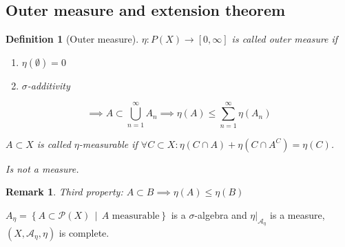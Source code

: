 \documentclass[a4paper]{article}
\newcounter{lecref}[section]
\numberwithin{lecref}{section}
\theoremstyle{break}
\newtheorem{definition}[lecref]{Definition}
\newtheorem*{Remark}{Remark}
\newcommand{\SetDef}[2]{\left\{#1\,\mid\,#2\right\}}
\begin{document}
\subsection{Outer measure and extension theorem}
\begin{definition}[Outer measure]
  $\eta: P(X) \to [0, \infty]$ is called \emph{outer measure} if
  \begin{enumerate}
    \item $\eta(\emptyset) = 0$
    \item $\sigma$-additivity
  \end{enumerate}
  \[ \implies A \subset \bigcup_{n=1}^\infty A_n \implies \eta(A) \leq \sum_{n=1}^\infty \eta(A_n) \]

  $A \subset X$ is called $\eta$-measurable if $\forall C \subset X: \eta(C \cap A) + \eta(C \cap A^C) = \eta(C)$.

  Is not a measure.
\end{definition}

\begin{Remark}
  Third property: $A \subset B \implies \eta(A) \leq \eta(B)$
\end{Remark}

\begin{theorem}[Carathéodory]
  $A_\eta = \SetDef{A \subset \mathcal P(X)}{A \text{ measurable}}$ is a $\sigma$-algebra and $\left.\eta\right|_{\mathcal A_{\eta}}$ is a measure, $(X, \mathcal A_\eta, \eta)$ is complete.
\end{theorem}
\end{document}
